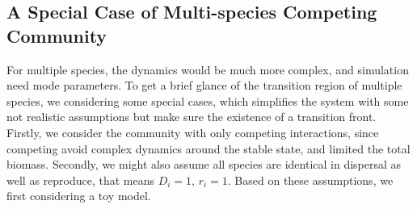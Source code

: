\subsection{A Special Case of Multi-species Competing Community}

    For multiple species, the dynamics would be much more complex, and simulation need mode parameters. To get a brief glance of the transition region of multiple species, we considering some special cases, which simplifies the system with some not realistic assumptions but make sure the existence of a transition front. Firstly, we consider the community with only competing interactions, since competing avoid complex dynamics around the stable state, and limited the total biomass. Secondly, we might also assume all species are identical in dispersal as well as reproduce, that means $D_i = 1$, $r_i = 1$. Based on these assumptions, we first considering a toy model.

